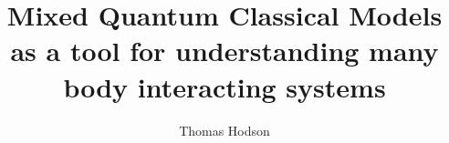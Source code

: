 \documentclass[a4paper,12pt]{report}
\begin{document}
\title{\LARGE {\bf Mixed Quantum Classical Models as a tool for understanding many body interacting systems}\\
 \vspace*{6mm}
}

\author{Thomas Hodson}

\normallinespacing
\maketitle

\preface
% 


\body



%     



\end{document}
